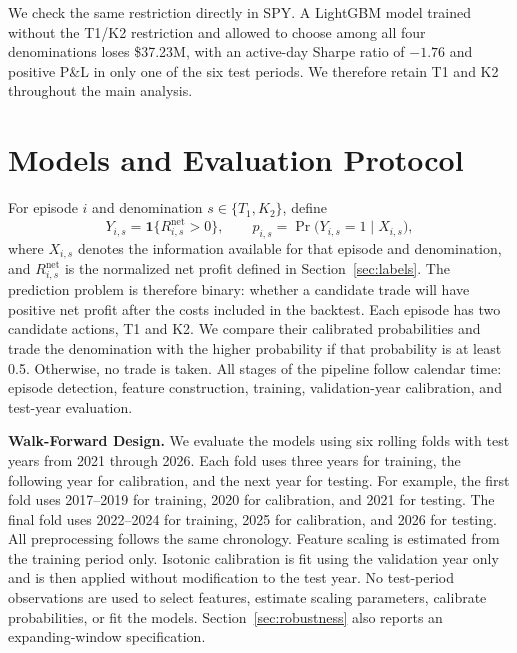 \documentclass[sigconf,review,anonymous]{acmart}
\begin{document}
We check the same restriction directly in SPY. A LightGBM model trained without the T1/K2 restriction and allowed to choose among all four denominations loses \$37.23M, with an active-day Sharpe ratio of $-1.76$ and positive P\&L in only one of the six test periods. We therefore retain T1 and K2 throughout the main analysis.

\section{Models and Evaluation Protocol}
\label{sec:method}

For episode $i$ and denomination $s\in\{T_1,K_2\}$, define
\[
Y_{i,s}=\mathbf 1\{R^{\mathrm{net}}_{i,s}>0\},
\qquad
p_{i,s}=
\Pr\big(Y_{i,s}=1\mid X_{i,s}\big),
\]
where $X_{i,s}$ denotes the information available for that episode and denomination, and $R^{\mathrm{net}}_{i,s}$ is the normalized net profit defined in Section~\ref{sec:labels}. The prediction problem is therefore binary: whether a candidate trade will have positive net profit after the costs included in the backtest.
Each episode has two candidate actions, T1 and K2. We compare their calibrated probabilities and trade the denomination with the higher probability if that probability is at least 0.5. Otherwise, no trade is taken. All stages of the pipeline follow calendar time: episode detection, feature construction, training, validation-year calibration, and test-year evaluation.

\smallskip\noindent\textbf{Walk-Forward Design.}
We evaluate the models using six rolling folds with test years from 2021 through 2026. Each fold uses three years for training, the following year for calibration, and the next year for testing. For example, the first fold uses 2017--2019 for training, 2020 for calibration, and 2021 for testing. The final fold uses 2022--2024 for training, 2025 for calibration, and 2026 for testing.
All preprocessing follows the same chronology. Feature scaling is estimated from the training period only. Isotonic calibration is fit using the validation year only and is then applied without modification to the test year. No test-period observations are used to select features, estimate scaling parameters, calibrate probabilities, or fit the models. Section~\ref{sec:robustness} also reports an expanding-window specification.
\end{document}
